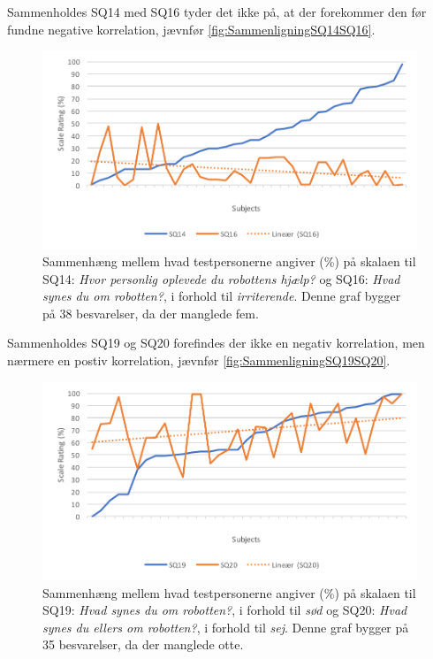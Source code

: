 Sammenholdes SQ14 med SQ16 tyder det ikke på, at der forekommer den før fundne negative korrelation, jævnfør \autoref{fig:SammenligningSQ14SQ16}.
%
\begin{figure}[H]
	\centering
	\includegraphics[width=\textwidth]{Figure/Korrelationsgrafer/SQ14+SQ16}
	\caption{Sammenhæng mellem hvad testpersonerne angiver (\%) på skalaen til SQ14: \textit{Hvor personlig oplevede du robottens hjælp?} og SQ16: \textit{Hvad synes du om robotten?}, i forhold til \textit{irriterende}. Denne graf bygger på 38 besvarelser, da der manglede fem.}
	\label{fig:SammenligningSQ14SQ16}
\end{figure}
\newpage
\noindent
%
Sammenholdes SQ19 og SQ20 forefindes der ikke en negativ korrelation, men nærmere en postiv korrelation, jævnfør \autoref{fig:SammenligningSQ19SQ20}.
%
\begin{figure}[H]
	\centering
	\includegraphics[width=\textwidth]{Figure/Korrelationsgrafer/SQ19+SQ20}
	\caption{Sammenhæng mellem hvad testpersonerne angiver (\%) på skalaen til SQ19: \textit{Hvad synes du om robotten?}, i forhold til \textit{sød} og SQ20: \textit{Hvad synes du ellers om robotten?}, i forhold til \textit{sej}. Denne graf bygger på 35 besvarelser, da der manglede otte.}
	\label{fig:SammenligningSQ19SQ20}
\end{figure}
\noindent
%

